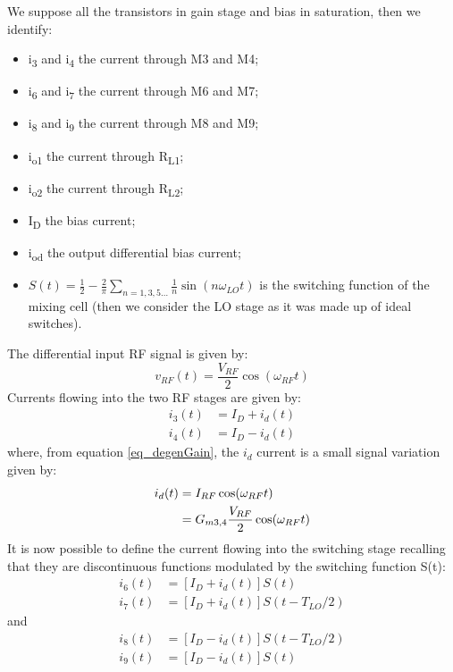 We suppose all the transistors in gain stage and bias in saturation, then we identify:
\begin{itemize}
	\item i\textsubscript{3} and i\textsubscript{4} the current through M3 and M4;
	\item i\textsubscript{6} and i\textsubscript{7} the current through M6 and M7;
	\item i\textsubscript{8} and i\textsubscript{9} the current through M8 and M9;
	\item i\textsubscript{o1} the current through R\textsubscript{L1};
	\item i\textsubscript{o2} the current through R\textsubscript{L2};
	\item I\textsubscript{D} the bias current;
	\item i\textsubscript{od} the output differential bias current;
	\item $S(t)=\frac{1}{2}-\frac{2}{\pi} \sum_{n=1,3,5 \dots}^{} \frac{1}{n}\sin(n\omega_{LO} t)$ is the switching function of the mixing cell (then we consider the LO stage as it was made up of ideal switches).
\end{itemize}
The differential input RF signal is given by:
\begin{equation}
\label{eq_inRFSignal}
v_{RF}(t)=\frac{V_{RF}}{2}\cos (\omega_{RF}t) 
\end{equation}
Currents flowing into the two RF stages are given by:
\begin{align}
i_3(t) &= I_D + i_d(t)\\
i_4(t) &= I_D - i_d(t)
\end{align}
where, from equation \ref{eq_degenGain}, the $i_d$ current is a small signal variation given by:
\begin{align}
i_d(t)&=I_{RF}\cos (\omega_{RF}t) \notag \\
&= G_{m3,4}\frac{V_{RF}}{2}\cos (\omega_{RF}t) 
\end{align}
It is now possible to define the current flowing into the switching stage recalling that they are discontinuous functions modulated by the switching function S(t):
\begin{align}
 i_6(t) &= [I_D + i_d(t)]S(t) \\
 i_7(t) &= [I_D + i_d(t)]S(t-T_{LO}/2)
\end{align}
and 
\begin{align}
i_8(t) &= [I_D - i_d(t)]S(t-T_{LO}/2) \\
i_9(t) &= [I_D - i_d(t)]S(t)
\end{align}
